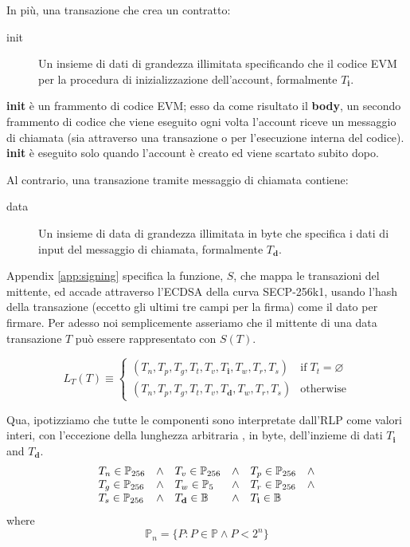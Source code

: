 \documentclass[9pt,oneside]{amsart}
\begin{document}
\begin{multicols}{2}
In più, una transazione che crea un contratto:

\begin{description}
\item[init] Un insieme di dati di grandezza illimitata specificando che il codice EVM per la procedura di inizializzazione dell'account, formalmente $T_\mathbf{i}$.
\end{description}

\textbf{init} è un frammento di codice EVM; esso da come risultato il \textbf{body}, un secondo frammento di codice che viene eseguito ogni volta l'account riceve un messaggio di chiamata (sia attraverso una transazione o per l'esecuzione interna del codice). \textbf{init} è eseguito solo quando l'account è creato ed viene scartato subito dopo.

Al contrario, una transazione tramite messaggio di chiamata contiene:

\begin{description}
\item[data] Un insieme di data di grandezza illimitata in byte che specifica i dati di input del messaggio di chiamata, formalmente $T_\mathbf{d}$.
\end{description}

Appendix \ref{app:signing} specifica la funzione, $S$, che mappa le transazioni del mittente, ed accade attraverso l'ECDSA della curva SECP-256k1, usando l'hash della transazione (eccetto gli ultimi tre campi per la firma) come il dato per firmare. Per adesso noi semplicemente asseriamo che il mittente di una data transazione $T$ può essere rappresentato con $S(T)$.

\begin{equation}
L_T(T) \equiv \begin{cases}
(T_n, T_p, T_g, T_t, T_v, T_\mathbf{i}, T_w, T_r, T_s) & \text{if} \; T_t = \varnothing\\
(T_n, T_p, T_g, T_t, T_v, T_\mathbf{d}, T_w, T_r, T_s) & \text{otherwise} 
\end{cases}
\end{equation}

Qua, ipotizziamo che tutte le componenti sono interpretate dall'RLP come valori interi, con l'eccezione della lunghezza arbitraria , in byte, dell'inzieme di dati $T_\mathbf{i}$ and $T_\mathbf{d}$.
\begin{equation}
\begin{array}[t]{lclclc}
T_n \in \mathbb{P}_{256} & \wedge & T_v \in \mathbb{P}_{256} & \wedge & T_p \in \mathbb{P}_{256} & \wedge \\
T_g \in \mathbb{P}_{256} & \wedge & T_w \in \mathbb{P}_5 & \wedge & T_r \in \mathbb{P}_{256} & \wedge \\
T_s \in \mathbb{P}_{256} & \wedge & T_\mathbf{d} \in \mathbb{B} & \wedge & T_\mathbf{i} \in \mathbb{B}
\end{array}
\end{equation}
where
\begin{equation}
\mathbb{P}_n = \{ P: P \in \mathbb{P} \wedge P < 2^n \}
\end{equation}


\end{multicols}
\end{document}
